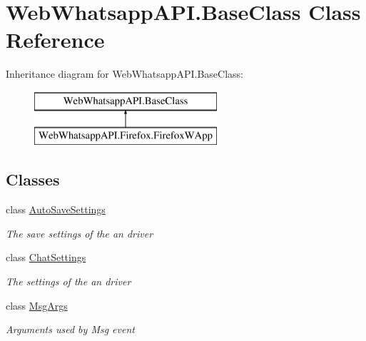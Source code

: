 \hypertarget{class_web_whatsapp_a_p_i_1_1_base_class}{}\section{Web\+Whatsapp\+A\+P\+I.\+Base\+Class Class Reference}
\label{class_web_whatsapp_a_p_i_1_1_base_class}
Inheritance diagram for Web\+Whatsapp\+A\+P\+I.\+Base\+Class\+:\begin{figure}[H]
\begin{center}
\leavevmode
\includegraphics[height=2.000000cm]{class_web_whatsapp_a_p_i_1_1_base_class}
\end{center}
\end{figure}
\subsection*{Classes}
\begin{DoxyCompactItemize}
\item 
class \hyperlink{class_web_whatsapp_a_p_i_1_1_base_class_1_1_auto_save_settings}{Auto\+Save\+Settings}
\begin{DoxyCompactList}\small\item\em The save settings of the an driver \end{DoxyCompactList}\item 
class \hyperlink{class_web_whatsapp_a_p_i_1_1_base_class_1_1_chat_settings}{Chat\+Settings}
\begin{DoxyCompactList}\small\item\em The settings of the an driver \end{DoxyCompactList}\item 
class \hyperlink{class_web_whatsapp_a_p_i_1_1_base_class_1_1_msg_args}{Msg\+Args}
\begin{DoxyCompactList}\small\item\em Arguments used by Msg event \end{DoxyCompactList}\end{DoxyCompactItemize}
